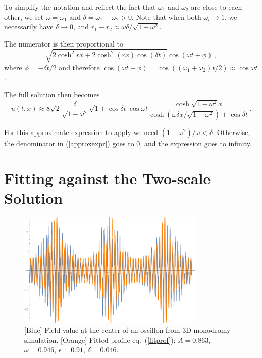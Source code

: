 \documentclass[11pt]{book}
\begin{document}
To simplify the notation and reflect the fact that $\omega_1$ and $\omega_2$ are close to each other, we set $\omega=\omega_1$ and $\delta=\omega_1-\omega_2>0$. Note that when both $\omega_i\to1$, we necessarily have $\delta\to0$, and $r_1-r_2\approx \omega \delta/\sqrt{1-\omega^2}$.

The numerator is then proportional to
\begin{equation}
  \sqrt{2\cosh^2 rx + 2\cosh^2 (rx) \cos(\delta t)}\cos(\omega t+\phi)\,,
\end{equation}
where $\phi = -\delta t/2$ and therefore $\cos(\omega t+\phi)=\cos((\omega_1+\omega_2)t/2)\approx\cos\omega t$.

The full solution then becomes
\begin{equation}\label{approxexpr}
  u(t,x) \approx 8\sqrt{2}  \frac{\delta}{\sqrt{1-\omega^2}} \sqrt{1+\cos\delta t} \cos\omega t \frac{\cosh \sqrt{1-\omega^2} x}{\cosh(\omega\delta x/\sqrt{1-\omega^2}) + \cos \delta t}\,.
\end{equation}

For this approximate expression to apply we need $(1-\omega^2)/\omega < \delta$. Otherwise, the denominator in  (\ref{approxexpr}) goes to 0, and the expression goes to infinity.

\section{Fitting against the Two-scale Solution}

\begin{figure}
  \centering
  \includegraphics[width=0.8\textwidth]{plot/simul-profile.png}
  \caption{[Blue] Field value at the center of an oscillon from 3D monodromy simulation. [Orange] Fitted profile eq.~(\ref{fitprof}); $A=0.863$, $\omega=0.946$, $\epsilon=0.91$,  $\delta=0.046$.}\label{simul-prof}
\end{figure}
\end{document}
